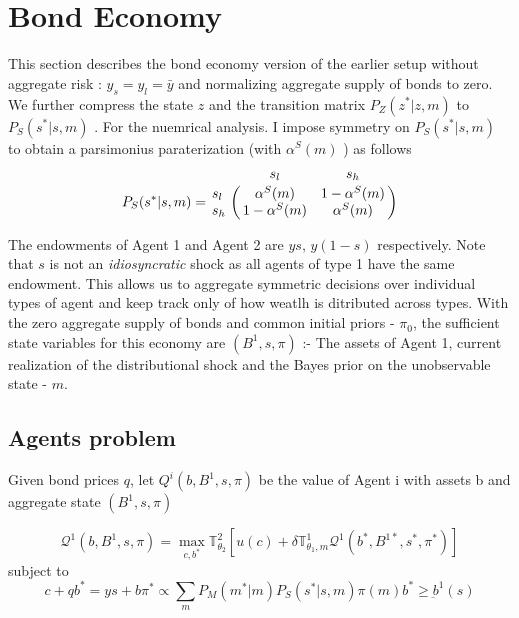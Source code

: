 \documentclass[12pt]{article}
\begin{document}
\section{Bond Economy}
This section describes the bond economy version of the earlier setup without aggregate risk  : $y_s=y_l=\bar{y}$ and normalizing aggregate supply of bonds to zero. We further compress the state $z$ and the transition matrix $P_Z(z^*|z,m)$ to $P_S(s^*|s,m)$ . For the nuemrical analysis. I impose symmetry on  $P_S(s^*|s,m)$ to obtain a parsimonius paraterization (with $\alpha^{S}(m)$ ) as follows
\[P_S(s^*|s,m)=\bordermatrix{~ & s_l & s_h \cr
														s_l & \alpha^S(m) & 1-\alpha^S(m) \cr
														s_h & 1-\alpha^S(m) & \alpha^S(m) \cr} \]

\noindent The endowments of Agent 1 and Agent 2 are $ys$, $y(1-s)$ respectively. Note that $s$ is not an \emph{idiosyncratic} shock as all agents of type 1 have the same endowment. This allows us to aggregate symmetric decisions over individual types of agent and keep track only of how weatlh is ditributed across types. With the zero aggregate supply of bonds and common initial priors - $\pi_0$, the sufficient state variables for this economy are $(B^1, s, \pi)$   :- The assets of Agent 1, current realization of the distributional shock and the Bayes prior on the unobservable state - $m$.

\subsection{Agents problem}
\noindent Given bond prices $q$, let $Q^i(b,B^1,s,\pi)$ be the value of Agent i with assets b and aggregate state $(B^1,s,\pi)$

\begin{equation}
\label{BEAgent1ValueFunction}
\mathcal{Q}^1(b,B^1,s,\pi)=\max_{c,b^*} { \mathbb{T}^2_{\theta_2} \left[u(c)+\delta \mathbb{T}^1_{\theta_1,m}\mathcal{Q}^1 (b^*,B^{1*},s^*,\pi^*)\right]}
\end{equation}
subject to
\begin{subequations}
\begin{equation}
c+qb^*=ys+b
\end{equation}
\begin{equation}
\pi^* \propto \sum_{m}{P_M(m^*|m)P_S(s^*|s,m)\pi(m)}
\end{equation}
\begin{equation}
b^* \geq \underbar{b}^1(s)
\end{equation}
\end{subequations}
\end{document}

